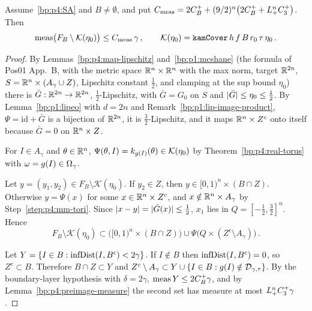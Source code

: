 \begin{theorem}\label{bp:p4:main-measure}
Assume~\eqref{bp:p4:SA} and $B\ne\emptyset$, and put
$C_{\mathrm{meas}}=2C_B^++(9/2)^n\bigl(2C_B^++L_{+}^nC_3^+\bigr)$. Then
\begin{equation*}
\operatorname{meas}\bigl(F_B\setminus\mathcal K(\eta_0)\bigr)\le C_{\mathrm{meas}}\,\gamma\,,\qquad
\mathcal K(\eta_0)=\texttt{kamCover}\,h\,f\,B\,r_0\,\tau\,\eta_0\,.
\end{equation*}
\end{theorem}

\begin{proof}
\label{step:p4:mm-extension}
By Lemmas~\ref{bp:p4:map-lipschitz} and~\ref{bp:p1:mcshane} (the formula of Pos01 App.~B, with the metric
space $\mathbb{R}^n\times\mathbb{R}^n$ with the max norm, target $\mathbb{R}^{2n}$, $S=\mathbb{R}^n\times(A_\gamma\cup Z)$, Lipschitz
constant $\frac12$, and clamping at the sup bound $\eta_0$) there is $\bar G:\mathbb{R}^{2n}\to\mathbb{R}^{2n}$,
$\frac12$-Lipschitz, with $\bar G=G_0$ on $S$ and $\lvert \bar G\rvert\le\eta_0\le\frac12$.
By Lemma~\ref{bp:p1:lipeo} with $d=2n$ and Remark~\ref{bp:p1:lip-image-product},
$\Psi=\mathrm{id}+\bar G$ is a bijection of $\mathbb{R}^{2n}$, it is $\frac32$-Lipschitz, and it maps $\mathbb{R}^n\times Z^c$ onto itself because $\bar G=0$ on $\mathbb{R}^n\times Z$.

\label{step:p4:mm-tori}
For $I\in A_\gamma$ and $\theta\in\mathbb{R}^n$, $\Psi(\theta,I)=k_{g(I)}(\theta)\in\mathcal K(\eta_0)$ by
Theorem~\ref{bp:p4:real-torus} with $\omega=g(I)\in\Omega_\gamma$.

\label{step:p4:mm-complement}
Let $y=(y_1,y_2)\in F_B\setminus\mathcal K(\eta_0)$. If $y_2\in Z$, then $y\in[0,1)^n\times(B\cap Z)$.
Otherwise $y=\Psi(x)$ for some $x\in\mathbb{R}^n\times Z^c$, and $x\notin\mathbb{R}^n\times A_\gamma$ by
Step~\ref{step:p4:mm-tori}. Since $\lvert x-y\rvert=\lvert \bar G(x)\rvert\le\frac12$, $x_1$ lies in
$Q=[-\frac12,\frac32]^n$. Hence
\begin{equation*}
F_B\setminus\mathcal K(\eta_0)\subset\bigl([0,1)^n\times(B\cap Z)\bigr)\cup\Psi\bigl(Q\times(Z^c\setminus A_\gamma)\bigr)\,.
\end{equation*}

\label{step:p4:mm-bad}
Let $Y=\{I\in B:\operatorname{infDist}(I,B^c)<2\gamma\}$. If $I\notin B$ then $\operatorname{infDist}(I,B^c)=0$, so $Z^c\subset B$.
Therefore $B\cap Z\subset Y$ and $Z^c\setminus A_\gamma\subset Y\cup\{I\in B:g(I)\notin\mathcal{D}_{\gamma,\tau}\}$.
By the boundary-layer hypothesis with $\delta=2\gamma$, $\operatorname{meas} Y\le2C_B^+\gamma$, and by
Lemma~\ref{bp:p4:preimage-measure} the second set has measure at most $L_{+}^nC_3^+\gamma$.


\end{proof}
